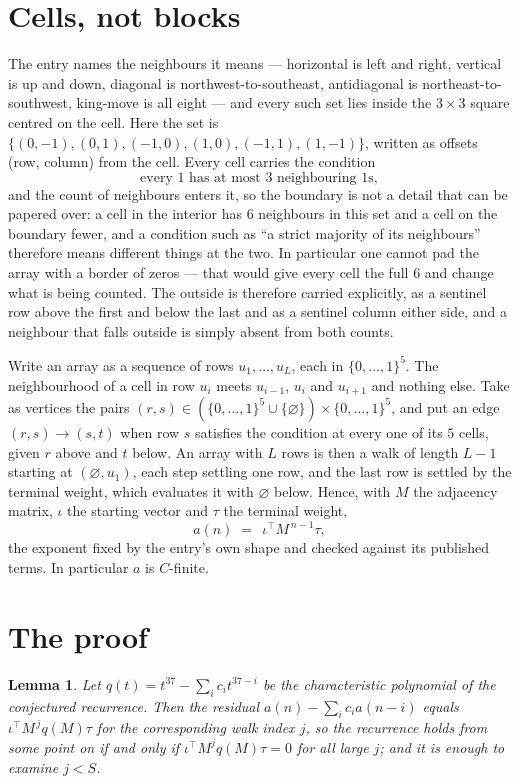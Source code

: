 \documentclass[11pt,a4paper]{article}
\theoremstyle{plain}
\newtheorem{lemma}[theorem]{Lemma}
\theoremstyle{definition}
\begin{document}
\section{Cells, not blocks}

The entry names the neighbours it means --- horizontal is left and right, vertical is up and
down, diagonal is northwest-to-southeast, antidiagonal is northeast-to-southwest, king-move is
all eight --- and every such set lies inside the $3\times3$ square centred on the cell. Here
the set is $\{(0,-1), (0,1), (-1,0), (1,0), (-1,1), (1,-1)\}$, written as offsets (row, column) from the cell. Every cell carries
the condition
\[
\text{every 1 has at most 3 neighbouring 1s},
\]
and the count of neighbours enters it, so the boundary is not a detail that can be papered
over: a cell in the interior has $6$ neighbours in this set and a cell on the boundary
fewer, and a condition such as ``a strict majority of its neighbours'' therefore means
different things at the two. In particular one cannot pad the array with a border of zeros ---
that would give every cell the full $6$ and change what is being counted. The outside is
therefore carried
explicitly, as a sentinel row above the first and below the last and as a sentinel column
either side, and a neighbour that falls outside is simply absent from both counts.

Write an array as a sequence of rows $u_1,\dots,u_L$, each in
$\{0,\dots,1\}^{5}$. The neighbourhood of a cell in row $u_i$ meets $u_{i-1}$,
$u_i$ and $u_{i+1}$ and nothing else. Take as vertices the pairs
$(r,s)\in(\{0,\dots,1\}^{5}\cup\{\varnothing\})\times\{0,\dots,1\}^{5}$,
and put an edge $(r,s)\to(s,t)$ when row $s$ satisfies the condition at every one of its
$5$ cells, given $r$ above and $t$ below. An array with $L$ rows is then a walk of length
$L-1$ starting at $(\varnothing,u_1)$, each step settling one row, and the last row is
settled by the terminal weight, which evaluates it with $\varnothing$ below. Hence,
with $M$ the adjacency matrix, $\iota$ the starting vector and $\tau$ the terminal weight,
\[
a(n)\;=\;\,\iota^{\!\top}M^{\,n-1}\tau ,
\]
the exponent fixed by the entry's own shape and checked against its published terms. In
particular $a$ is $C$-finite.

\section{The proof}

\begin{lemma}\label{lem:crit}
Let $q(t)=t^{37}-\sum_i c_it^{37-i}$ be the characteristic polynomial of the
conjectured recurrence. Then the residual $a(n)-\sum_ic_ia(n-i)$ equals
$\iota^{\!\top}M^{\,j}q(M)\tau$ for the corresponding walk index $j$, so the
recurrence holds from some point on if and only if $\iota^{\!\top}M^{j}q(M)\tau=0$ for all
large $j$; and it is enough to examine $j<S$.
\end{lemma}
\end{document}
